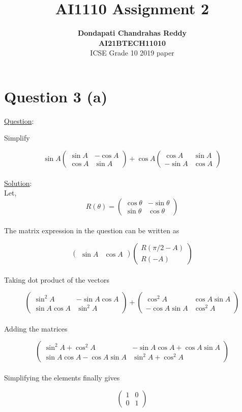 \documentclass[journal,12pt,twocolumn]{IEEEtran}
\newcommand{\myvec}[1]{\ensuremath{\begin{pmatrix}#1\end{pmatrix}}}
\begin{document}
\title{\textbf{AI1110 Assignment 2} }
\author{\textbf{Dondapati Chandrahas Reddy}\\ \textbf{AI21BTECH11010}\\ ICSE Grade 10 2019 paper}

\maketitle

{\section {Question 3 (a) \newline}}
{\large \underline{Question}:\newline}

Simplify

\begin{equation*}
\sin A\myvec{\sin A &  -\cos A \\ \cos A & \sin A} + \cos A \myvec{\cos A &  \sin A \\ -\sin A & \cos A}
\end{equation*}\\

{\large \underline{Solution}:}\\

Let,
\begin{equation*}
R(\theta) = \myvec{\cos \theta &  -\sin \theta \\ \sin \theta & \cos \theta}
\end{equation*}\\

The matrix expression in the question can be written as

\begin{equation*}
\myvec{\sin A & \cos A} \myvec{R(\pi/2 - A) \\ R( -A)}
\end{equation*}\\

Taking dot product of the vectors

\begin{equation*}
\myvec{\sin^2 A &  -\sin A\cos A \\ \sin A\cos A & \sin^2 A} +\myvec{\cos^2 A & \cos A\sin A \\ -\cos A\sin A & \cos^2 A}
\end{equation*}\\

Adding the matrices

\begin{equation*}
\myvec{\sin^2 A + \cos^2 A &  -\sin A \cos A +\cos A \sin A \\ \sin A \cos A -\cos A \sin A & \sin^2 A + \cos^2 A}
\end{equation*}\\

Simplifying the elements finally gives

\begin{equation*}
\myvec{1 & 0 \\ 0 & 1}
\end{equation*}\\
\end{document}
